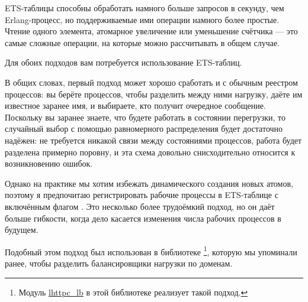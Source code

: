 ETS-таблицы способны обработать намного больше запросов в секунду, чем Erlang-процесс, но поддерживаемые ими операции намного более простые. Чтение одного элемента, атомарное увеличение или уменьшение счётчика --- это самые сложные операции, на которые можно рассчитывать в общем случае.

Для обоих подходов вам потребуется использование ETS-таблиц.

В общих словах, первый подход может хорошо сработать и с обычным реестром процессов: вы берёте  процессов, чтобы разделить между ними нагрузку, даёте им известное заранее имя, и выбираете, кто получит очередное сообщение. Поскольку вы заранее знаете, что будете работать в состоянии перегрузки, то случайный выбор с помощью равномерного распределения будет достаточно надёжен: не требуется никакой связи между состояниями процессов, работа будет разделена примерно поровну, и эта схема довольно снисходительно относится к возникновению ошибок.

Однако на практике мы хотим избежать динамического создания новых атомов, поэтому я предпочитаю регистрировать рабочие процессы в ETS-таблице с включённым флагом . Это несколько более трудоёмкий подход, но он даёт больше гибкости, когда дело касается изменения числа рабочих процессов в будущем.

Подобный этом подход был использован в библиотеке \footnote{Модуль \href{https://github.com/ferd/lhttpc/blob/master/src/lhttpc\_lb.erl}{lhttpc\_lb} в этой библиотеке реализует такой подход.}, которую мы упоминали ранее, чтобы разделить балансировщики нагрузки по доменам.

